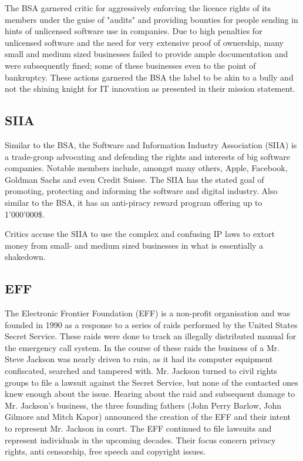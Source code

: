 \documentclass[a4paper]{report}
\begin{document}
The BSA garnered critic for aggressively enforcing the licence rights of its members under the guise of "audits" and providing bounties for people sending in hints of unlicensed software use in companies. Due to high penalties for unlicensed software and the need for very extensive proof of ownership, many small and medium sized businesses failed to provide ample documentation and were subsequently fined; some of these businesses even to the point of bankruptcy. These actions garnered the BSA the label to be akin to a bully and not the shining knight for IT innovation as presented in their mission statement. \parencite{Gaskin2009}

\subsection{SIIA}
\label{ssec:SIIA}
Similar to the BSA, the Software and Information Industry Association (SIIA) is a trade-group advocating and defending the rights and interests of big software companies. Notable members include, amongst many others, Apple, Facebook, Goldman Sachs and even Credit Suisse. The SIIA has the stated goal of promoting, protecting and informing the software and digital industry. Also similar to the BSA, it has an anti-piracy reward program offering up to 1'000'000\$. \parencite{SIIAreward}

Critics accuse the SIIA to use the complex and confusing IP laws to extort money from small- and medium sized businesses in what is essentially a shakedown. \parencite{Melymuka2006}

\subsection{EFF}
\label{sec:EFF}
The Electronic Frontier Foundation (EFF) is a non-profit organisation and was founded in 1990 as a response to a series of raids performed by the United States Secret Service. These raids were done to track an illegally distributed manual for the emergency call system. In the course of these raids the business of a Mr. Steve Jackson was nearly driven to ruin, as it had its computer equipment confiscated, searched and tampered with. Mr. Jackson turned to civil rights groups to file a lawsuit against the Secret Service, but none of the contacted ones knew enough about the issue. Hearing about the raid and subsequent damage to Mr. Jackson's business, the three founding fathers (John Perry Barlow, John Gilmore and Mitch Kapor) announced the creation of the EFF and their intent to represent Mr. Jackson in court.
The EFF continued to file lawsuits and represent individuals in the upcoming decades. Their focus concern privacy rights, anti censorship, free speech and copyright issues. \parencite{EFFhistory} \parencite{Schultz}
\end{document}
